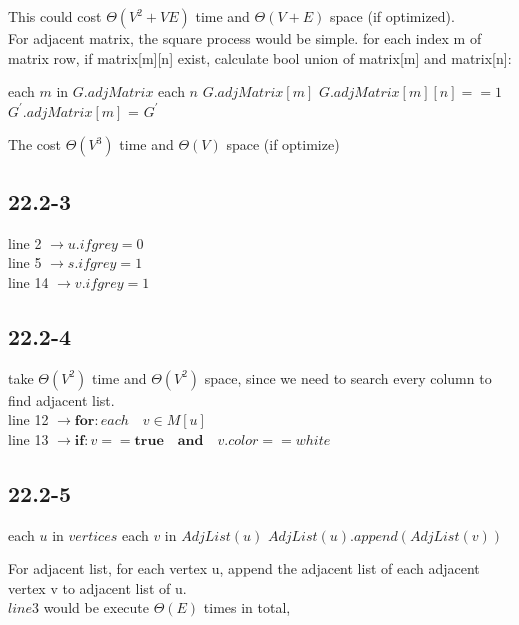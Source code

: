 \documentclass[]{article}
\begin{document}
This could cost $\Theta(V^2 + VE)$ time and $\Theta(V+E)$ space (if optimized).\\

For adjacent matrix, the square process would be simple. for each index m of matrix row, if matrix[m][n] exist, calculate bool union of matrix[m] and matrix[n]:

\begin{codebox}
	
	\li \For each $m$ in $G.adjMatrix$
	\li \Do \For each $n$ $G.adjMatrix[m]$
	\li 	\Do \If $G.adjMatrix[m][n] == 1$
	\li         \Then $G^{'}.adjMatrix[m]$ = 
	\End
	\End
	\End
	\li \Return $G^{'}$
\end{codebox}

The  cost $\Theta(V^3)$ time and $\Theta(V)$ space (if optimize)

\subsection{22.2-3}
line 2 $\rightarrow u.ifgrey = 0$\\
line 5 $\rightarrow s.ifgrey = 1$\\
line 14 $\rightarrow v.ifgrey = 1$

\subsection{22.2-4}
take $\Theta (V^2)$ time and $\Theta (V^2)$ space, since we need to search every column to find adjacent list.\\
line 12 $\rightarrow \textbf{for}: each \quad v \in M[u]$\\
line 13 $\rightarrow \textbf {if}: v == \textbf{true} \quad \textbf{and} \quad v.color == white $

\subsection{22.2-5}

\begin{codebox}
	
	\li \For each $u$ in $vertices$
	\li		\Do \For each $v$ in $AdjList(u)$
	\li 		\Do $AdjList(u).append(AdjList(v))$
	\End
	\End
\end{codebox}

For adjacent list, for each vertex u, append the adjacent list of each adjacent vertex v to adjacent list of u.\\
$line 3$ would be execute $\Theta(E)$ times in total, 
\end{document}
